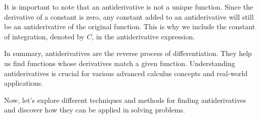 It is important to note that an antiderivative is not a unique
function. Since the derivative of a constant is zero, any constant
added to an antiderivative will still be an antiderivative of the
original function. This is why we include the constant of integration,
denoted by $C$, in the antiderivative expression.

In summary, antiderivatives are the reverse process of
differentiation. They help us find functions whose derivatives match a
given function. Understanding antiderivatives is crucial for various
advanced calculus concepts and real-world applications.

Now, let's explore different techniques and methods for finding
antiderivatives and discover how they can be applied in solving
problems.
